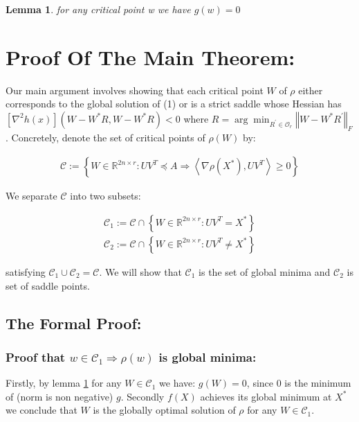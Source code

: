 \documentclass{article}
\newtheorem{lemma}[theorem]{Lemma}
\begin{document}
\begin{lemma} \label{lemma_7}
 for any critical point w we have $g\left(w\right) = 0$
\end{lemma}

\section{Proof Of The Main Theorem:}

Our main argument involves showing that each critical point $W$ of $\rho$ either corresponds to the global solution of (1) or is a strict saddle whose Hessian has $\left[\nabla^2 h\left(x\right)\right]\left(W-W^*R,W-W^*R\right) < 0$ where $R=\arg\min_{R^{'}\in\mathcal{O}_r}\left\Vert W-W^*R^{'}\right\Vert_F$. Concretely, denote the set of critical points of $\rho\left(W\right)$ by:

\begin{align*}
    \mathcal{C}:=\left\{W\in\mathbb{R}^{2n\times r}:UV^T\preceq A\Rightarrow \left<\nabla \rho\left(X^{*}\right),UV^T\right>\ge0\right\}
\end{align*}

We separate $\mathcal{C}$ into two subsets:

\begin{align*}
    \mathcal{C}_1:=\mathcal{C} \cap \left\{W\in\mathbb{R}^{2n\times r}:UV^T=X^*\right\}\\
    \mathcal{C}_2:=\mathcal{C} \cap \left\{W\in\mathbb{R}^{2n\times r}:UV^T\ne X^*\right\}
\end{align*}

satisfying $\mathcal{C}_1\cup \mathcal{C}_2 = \mathcal{C}$. We will show that $\mathcal{C}_1$ is the set of global minima and $\mathcal{C}_2$ is set of saddle points.

\subsection{The Formal Proof:}
\subsubsection{Proof that $w \in \mathcal{C}_1\Rightarrow \rho\left(w\right)$ is global minima:}

Firstly, by lemma \ref{lemma_7} for any $W\in\mathcal{C}_1$ we have: $g\left(W\right)=0$, since 0 is the minimum of (norm is non negative) $g$. Secondly $f\left(X\right)$ achieves its global minimum at $X^*$ we conclude that $W$ is the globally optimal solution of $\rho$ for any $W\in\mathcal{C}_1$.
\end{document}

